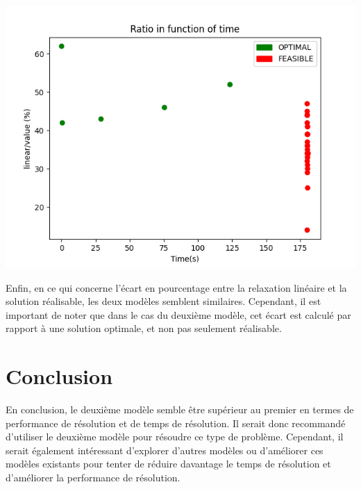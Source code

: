 \documentclass[10pt]{article}
\begin{document}
\begin{center}
\includegraphics[max width=\textwidth]{FH7W_HOUq0cJPP4pauJ7B-iXxNQurcsuVAkoylhbvhU_original_fullsize}
\end{center}

Enfin, en ce qui concerne l'écart en pourcentage entre la relaxation linéaire et la solution réalisable, les deux modèles semblent similaires. Cependant, il est important de noter que dans le cas du deuxième modèle, cet écart est calculé par rapport à une solution optimale, et non pas seulement réalisable.

\section*{Conclusion}
En conclusion, le deuxième modèle semble être supérieur au premier en termes de performance de résolution et de temps de résolution. Il serait donc recommandé d'utiliser le deuxième modèle pour résoudre ce type de problème. Cependant, il serait également intéressant d'explorer d'autres modèles ou d'améliorer ces modèles existants pour tenter de réduire davantage le temps de résolution et d'améliorer la performance de résolution.
\end{document}
